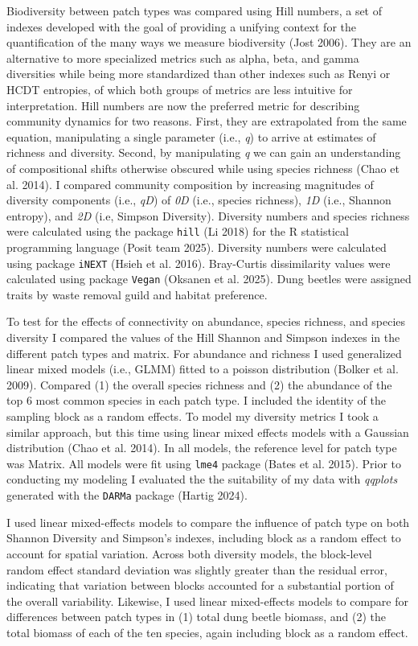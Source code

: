 \documentclass[
  man, donotrepeattitle]{apa6}
\begin{document}
Biodiversity between patch types was compared using Hill numbers, a set of indexes developed with the goal of providing a unifying context for the quantification of the many ways we measure biodiversity (Jost 2006). They are an alternative to more specialized metrics such as alpha, beta, and gamma diversities while being more standardized than other indexes such as Renyi or HCDT entropies, of which both groups of metrics are less intuitive for interpretation. Hill numbers are now the preferred metric for describing community dynamics for two reasons. First, they are extrapolated from the same equation, manipulating a single parameter (i.e., \emph{q}) to arrive at estimates of richness and diversity. Second, by manipulating \emph{q} we can gain an understanding of compositional shifts otherwise obscured while using species richness (Chao et al. 2014). I compared community composition by increasing magnitudes of diversity components (i.e., \emph{qD}) of \emph{0D} (i.e., species richness), \emph{1D} (i.e., Shannon entropy), and \emph{2D} (i.e, Simpson Diversity). Diversity numbers and species richness were calculated using the package \texttt{hill} (Li 2018) for the R statistical programming language (Posit team 2025). Diversity numbers were calculated using package \texttt{iNEXT} (Hsieh et al. 2016). Bray-Curtis dissimilarity values were calculated using package \texttt{Vegan} (Oksanen et al. 2025). Dung beetles were assigned traits by waste removal guild and habitat preference.

To test for the effects of connectivity on abundance, species richness, and species diversity I compared the values of the Hill Shannon and Simpson indexes in the different patch types and matrix. For abundance and richness I used generalized linear mixed models (i.e., GLMM) fitted to a poisson distribution (Bolker et al. 2009). Compared (1) the overall species richness and (2) the abundance of the top 6 most common species in each patch type. I included the identity of the sampling block as a random effects. To model my diversity metrics I took a similar approach, but this time using linear mixed effects models with a Gaussian distribution (Chao et al. 2014). In all models, the reference level for patch type was Matrix. All models were fit using \texttt{lme4} package (Bates et al. 2015). Prior to conducting my modeling I evaluated the the suitability of my data with \emph{qqplots} generated with the \texttt{DARMa} package (Hartig 2024).

I used linear mixed-effects models to compare the influence of patch type on both Shannon Diversity and Simpson's indexes, including block as a random effect to account for spatial variation. Across both diversity models, the block-level random effect standard deviation was slightly greater than the residual error, indicating that variation between blocks accounted for a substantial portion of the overall variability. Likewise, I used linear mixed-effects models to compare for differences between patch types in (1) total dung beetle biomass, and (2) the total biomass of each of the ten species, again including block as a random effect.
\end{document}
